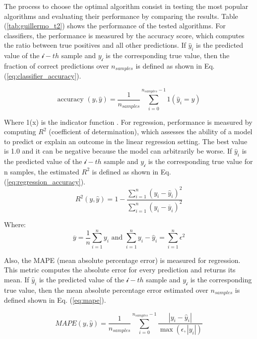 \documentclass[11pt,landscape]{article}
\begin{document}
\begin{multicols}{3}
The process to choose the optimal algorithm consist in testing the most popular
algorithms and evaluating their performance by comparing the results. Table (\ref{tab:guillermo_t2})
shows the performance of the tested algorithms. For classifiers, the performance
is measured by the accuracy score, which computes the ratio between true
positives and all other predictions. If ${\hat{y}}_i$ is the predicted value of
the $\mathcal{i}-th$ sample and $y_\mathcal{i}$ is the corresponding true value,
then the fraction of correct predictions over $n_{samples}$ is defined as shown
in Eq. (\ref{eq:classifier_accuracy}).

\begin{equation}
    \textrm{accuracy } (y, \hat{y})=\frac{1}{n_{samples}} \sum_{i=0}^{n_{samples} - 1} 1(\hat{y}_i=y)
    \label{eq:classifier_accuracy}
\end{equation}

Where 1(x) is the indicator function \cite{scikit}. For
regression, performance is measured by computing $R^2$ (coefficient of
determination), which assesses the ability of a model to predict or explain an
outcome in the linear regression setting. The best value is 1.0 and it can be
negative because the model can arbitrarily be worse. If ${\hat{y}}_i$ is the
predicted value of the $\mathcal{i}-th$ sample and $y_\mathcal{i}$ is the
corresponding true value for n samples, the estimated $R^2$ is defined as shown in
Eq. (\ref{eq:regression_accuracy}).
\begin{equation}
        R^2(y,\hat{y})=1 - \frac{\sum_{i=1}^{n}(y_i-\hat{y}_i)^2}{\sum_{i=1}^{n}(y_i-\overline{y}_i)^2}
    \label{eq:regression_accuracy}
\end{equation}

Where:
\begin{equation*}
        \overline{y} = \frac{1}{n}\sum_{i=1}^{n}y_i \textrm{ and } \sum_{i=1}^{n}{y_i - \hat{y}_i} = \sum_{i=1}^{n}\epsilon^2
\end{equation*}

Also, the MAPE (mean absolute percentage error) is measured for regression. This
metric computes the absolute error for every prediction and returns its mean. If
${\hat{y}}_i$ is the predicted value of the $\mathcal{i}-th$ sample and
$y_\mathcal{i}$ is the corresponding true value, then the mean absolute percentage
error estimated over $n_{samples}$ is defined shown in Eq. (\ref{eq:mape}).

\begin{equation}
        MAPE(y,\hat{y})=\frac{1}{n_{samples}}\sum_{i=0}^{n_{samples} - 1}\frac{\left|y_i - \hat{y}_i\right|}{\max(\epsilon,|y_i|)}
        \label{eq:mape}
\end{equation}


\end{multicols}
\end{document}
